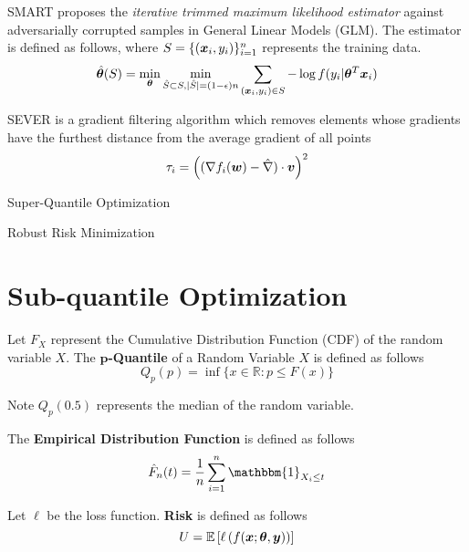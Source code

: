 \documentclass{article} %
\begin{document}
	SMART \cite{https://doi.org/10.48550/arxiv.2206.04777} proposes the \textit{iterative trimmed maximum likelihood estimator} against adversarially corrupted samples in General Linear Models (GLM). The estimator is defined as follows, where $S = \{({\bm{x}}_i,y_i)\}_{i=1}^n$ represents the training data. \vspace{1em}
	\begin{equation}
		\hat{{\bm{\theta}}}(S) = \min_{{\bm{\theta}}} \min_{\hat{S} \subset S, |\hat{S}| = (1-{\epsilon})n} \sum_{({\bm{x}}_i,y_i) \in S} -\log f(y_i|{\bm{\theta}}^T{\bm{x}}_i)
	\end{equation}
	
	SEVER \cite{DiakonikolasKKLSS19} is a gradient filtering algorithm which removes elements whose gradients have the furthest distance from the average gradient of all points
	\begin{equation}
		\tau_i = \left((\nabla f_i({\bm{w}}) - \hat{\nabla})\cdot {\bm{v}}\right)^2
	\end{equation}
	
	Super-Quantile Optimization \cite{ROCKAFELLAR2014140}
	
	Robust Risk Minimization \cite{RRM}
			
	\section{Sub-quantile Optimization}
	\label{headings}
	
	\begin{definition}
		Let $F_X$ represent the Cumulative Distribution Function (CDF) of the random variable $X$. The \textbf{$\mathbf{p}$-Quantile} of a Random Variable $X$ is defined as follows \vspace{1em}
		\begin{equation}
			Q_p(p) = \inf\{x\in\mathbb{R}: p \leq F(x)\} 
		\end{equation}
	\end{definition}

	Note $Q_p(0.5)$ represents the median of the random variable.
	
	\begin{definition}
		The \textbf{Empirical Distribution Function} is defined as follows
		\begin{equation}
			\hat{F}_n(t) = \frac{1}{n} \sum_{i=1}^n\mathbbm{1}_{X_i \leq t} 			
		\end{equation}
	\end{definition}
	
	\begin{definition}
		Let $\ell$ be the loss function. \textbf{Risk} is defined as follows
		\begin{equation}
			U = \mathbb{E}\left[\ell \left( f({\bm{x}};{\bm{\theta}},{\bm{y}})\right)\right]
		\end{equation}
	\end{definition}
	
\end{document}
